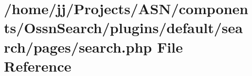 \hypertarget{components_2_ossn_search_2plugins_2default_2search_2pages_2search_8php}{}\section{/home/jj/\+Projects/\+A\+S\+N/components/\+Ossn\+Search/plugins/default/search/pages/search.php File Reference}
\label{components_2_ossn_search_2plugins_2default_2search_2pages_2search_8php}
